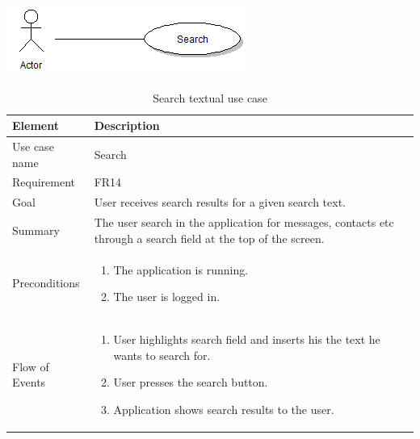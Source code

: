 \begin{table}
\begin{center}
\begin{center}
\includegraphics[width=\textwidth]{search}
\end{center}
\begin{tabular}{p{3cm}|p{12cm}} \hline
\textbf{Element} & \textbf{Description} \\ \hline \hline
Use case name & Search \\
Requirement & FR14 \\
Goal & User receives search results for a given search text. \\
Summary & The user search in the application for messages, contacts etc through a search field at the top of the screen. \\
Preconditions &
\begin{enumerate}
\item{}The application is running.
\item{}The user is logged in.
\end{enumerate} \\ \hline
Flow of Events &
\begin{enumerate}
\item{}User highlights search field and inserts his the text he wants to search for.
\item{}User presses the search button.
\item{}Application shows search results to the user.
\end{enumerate}\\ \hline
\end{tabular}
\end{center}
\caption{Search textual use case} \label{tab:search}
\end{table}

